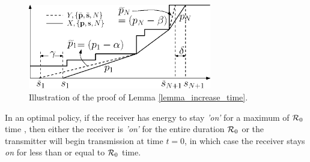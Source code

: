 \begin{figure}
\centering
  \centerline{\includegraphics[width=8cm]{Lemma4.eps}}
\caption{Illustration of the proof of Lemma \ref{lemma_increase_time}.}\label{lemma4}
\end{figure}

\begin{lemma}
In an optimal policy, if the receiver has energy to stay \textit{'on'} for a maximum of $\mathcal{R}_0$ time , then either the receiver is \textit{'on'} for the entire duration $\mathcal{R}_0$ or the transmitter will begin transmission at time $t=0$, in which case the receiver stays \textit{on} for less than or equal to $\mathcal{R}_0$ time. 
\label{transmission_duration}
\end{lemma}
